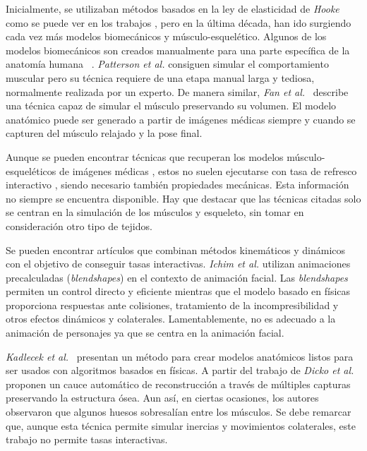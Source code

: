 Inicialmente, se utilizaban métodos basados en la ley de elasticidad de \emph{Hooke} como se puede ver en los trabajos \cite{russell93,wilhelms1995modeling}, pero en la última década, han ido surgiendo cada vez más modelos biomecánicos y músculo-esquelético. Algunos de los modelos biomecánicos son creados manualmente para una parte específica de la anatomía humana ~\cite{Lee2009}. \emph{Patterson et al.} \cite{Patterson2012} consiguen simular el comportamiento muscular pero su técnica requiere de una etapa manual larga y tediosa, normalmente realizada por un experto. De manera similar, \emph{Fan et al.}~ \cite{Fan2014} describe una técnica capaz de simular el músculo preservando su volumen. El modelo anatómico puede ser generado a partir de imágenes médicas siempre y cuando se capturen del músculo relajado y la pose final. 

Aunque se pueden encontrar técnicas que recuperan los modelos músculo-esqueléticos de imágenes médicas \cite{blemker2007, gilles2010, schmid2009}, estos no suelen ejecutarse con tasa de refresco interactivo%
, siendo necesario también propiedades mecánicas. Esta información no siempre se encuentra disponible. Hay que destacar que las técnicas citadas solo se centran en la simulación de los músculos y esqueleto, sin tomar en consideración otro tipo de tejidos.

Se pueden encontrar artículos que combinan métodos kinemáticos y dinámicos con el objetivo de conseguir tasas interactivas.  \emph{Ichim et al.} \cite{Ichim:2016} utilizan animaciones precalculadas (\emph{blendshapes}) en el contexto de animación facial. Las \emph{blendshapes} permiten un control directo y eficiente mientras que el modelo basado en físicas proporciona respuestas ante colisiones, tratamiento de la incompresibilidad y otros efectos dinámicos y colaterales. Lamentablemente, no es adecuado a la animación de personajes ya que se centra en la animación facial. 


\emph{Kadlecek et al.}~\cite{kadlecek-16-reconstructing} presentan un método para crear modelos anatómicos listos para ser usados con algoritmos basados en físicas. A partir del trabajo de \emph{Dicko et al.}\cite{Ali2013} proponen un cauce automático de reconstrucción a través de múltiples capturas preservando la estructura ósea. Aun así, en ciertas ocasiones, los autores observaron que algunos huesos sobresalían entre los músculos. Se debe remarcar que, aunque esta técnica permite simular inercias y movimientos colaterales, este trabajo no permite tasas interactivas.   %

